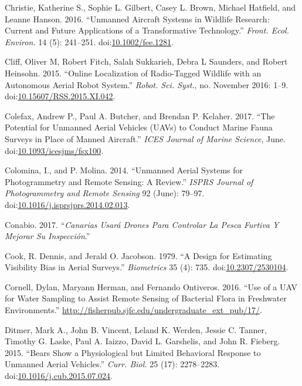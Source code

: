 \documentclass[]{interact}
\theoremstyle{plain}%
\theoremstyle{definition}
\theoremstyle{remark}
\begin{document}
\hypertarget{ref-christie_unmanned_2016}{}
Christie, Katherine S., Sophie L. Gilbert, Casey L. Brown, Michael
Hatfield, and Leanne Hanson. 2016. ``Unmanned Aircraft Systems in
Wildlife Research: Current and Future Applications of a Transformative
Technology.'' \emph{Front. Ecol. Environ.} 14 (5): 241--251.
doi:\href{https://doi.org/10.1002/fee.1281}{10.1002/fee.1281}.

\hypertarget{ref-cliff_online_2015}{}
Cliff, Oliver M, Robert Fitch, Salah Sukkarieh, Debra L Saunders, and
Robert Heinsohn. 2015. ``Online Localization of Radio-Tagged Wildlife
with an Autonomous Aerial Robot System.'' \emph{Robot. Sci. Syst.}, no.
November 2016: 1--9.
doi:\href{https://doi.org/10.15607/RSS.2015.XI.042}{10.15607/RSS.2015.XI.042}.

\hypertarget{ref-colefax_potential_2017}{}
Colefax, Andrew P., Paul A. Butcher, and Brendan P. Kelaher. 2017. ``The
Potential for Unmanned Aerial Vehicles (UAVs) to Conduct Marine Fauna
Surveys in Place of Manned Aircraft.'' \emph{ICES Journal of Marine
Science}, June.
doi:\href{https://doi.org/10.1093/icesjms/fsx100}{10.1093/icesjms/fsx100}.

\hypertarget{ref-colomina_unmanned_2014}{}
Colomina, I., and P. Molina. 2014. ``Unmanned Aerial Systems for
Photogrammetry and Remote Sensing: A Review.'' \emph{ISPRS Journal of
Photogrammetry and Remote Sensing} 92 (June): 79--97.
doi:\href{https://doi.org/10.1016/j.isprsjprs.2014.02.013}{10.1016/j.isprsjprs.2014.02.013}.

\hypertarget{ref-Conabio2017}{}
Conabio. 2017. ``\emph{Canarias Usará Drones Para Controlar La Pesca
Furtiva Y Mejorar Su Inspección}.''

\hypertarget{ref-cook_design_1979}{}
Cook, R. Dennis, and Jerald O. Jacobson. 1979. ``A Design for Estimating
Visibility Bias in Aerial Surveys.'' \emph{Biometrics} 35 (4): 735.
doi:\href{https://doi.org/10.2307/2530104}{10.2307/2530104}.

\hypertarget{ref-cornell_use_2016}{}
Cornell, Dylan, Maryann Herman, and Fernando Ontiveros. 2016. ``Use of a
UAV for Water Sampling to Assist Remote Sensing of Bacterial Flora in
Freshwater Environments.''
\url{http://fisherpub.sjfc.edu/undergraduate_ext_pub/17/}.

\hypertarget{ref-ditmer_bears_2015}{}
Ditmer, Mark A., John B. Vincent, Leland K. Werden, Jessie C. Tanner,
Timothy G. Laske, Paul A. Iaizzo, David L. Garshelis, and John R.
Fieberg. 2015. ``Bears Show a Physiological but Limited Behavioral
Response to Unmanned Aerial Vehicles.'' \emph{Curr. Biol.} 25 (17):
2278--2283.
doi:\href{https://doi.org/10.1016/j.cub.2015.07.024}{10.1016/j.cub.2015.07.024}.
\end{document}
